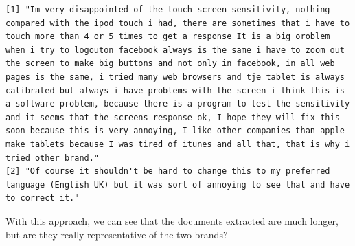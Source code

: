 \begin{verbatim}
[1] "Im very disappointed of the touch screen sensitivity, nothing compared with the ipod touch i had, there are sometimes that i have to touch more than 4 or 5 times to get a response It is a big oroblem when i try to logouton facebook always is the same i have to zoom out the screen to make big buttons and not only in facebook, in all web pages is the same, i tried many web browsers and tje tablet is always calibrated but always i have problems with the screen i think this is a software problem, because there is a program to test the sensitivity and it seems that the screens response ok, I hope they will fix this soon because this is very annoying, I like other companies than apple make tablets because I was tired of itunes and all that, that is why i tried other brand."
[2] "Of course it shouldn't be hard to change this to my preferred language (English UK) but it was sort of annoying to see that and have to correct it."                                                                                                                                                                                                                                                                                                                                                                                                                                                                                                                                                                                                                                                      
\end{verbatim}

With this approach, we can see that the documents extracted are much
longer, but are they really representative of the two brands?

